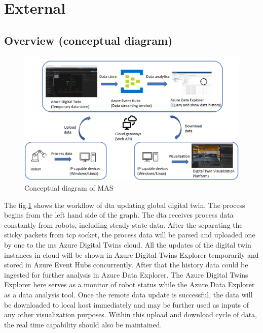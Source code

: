 \section{External} \label{chap: Meth-External}


\subsection{Overview (conceptual diagram)}\label{chap: Overview-External}

\begin{figure}[htb]
\includegraphics[width=\textwidth]{figures/DT_Conceptual_Diagram.png}

\centering
\caption{Conceptual diagram of MAS\label{fig: DTConceptual}}
\end{figure}

The fig.\ref{fig: DTConceptual} shows the workflow of \gls{dta} updating global digital twin.
The process begins from the left hand side of the graph. The \gls{dta} receives process data constantly from robots, including steady state data. 
After the separating the sticky packets from \gls{tcp} socket, the process data will be parsed and uploaded one by one to the \gls{ms} Azure Digital Twins cloud. 
All the updates of the digital twin instances in cloud will be shown in Azure Digital Twins Explorer temporarily and stored in Azure Event Hubs concurrently. 
After that the history data could be ingested for further analysis in Azure Data Explorer. 
The Azure Digital Twins Explorer here serves as a monitor of robot status while the Azure Data Explorer as a data analysis tool. 
Once the remote data update is successful, the data will be downloaded to local host immediately and may be further used as inputs of any other visualization purposes. 
Within this upload and download cycle of data, the real time capability should also be maintained.  



